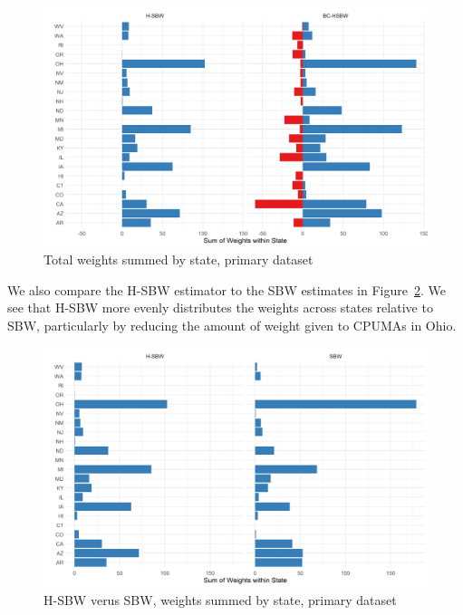 \documentclass[aoas]{imsart}
\theoremstyle{plain}
\theoremstyle{remark}
\begin{document}
\begin{figure}[H]
\begin{center}
    \caption{Total weights summed by state, primary dataset}
    \label{fig:statewghts}
    \includegraphics[scale=0.6]{01_Plots/weights-by-state-hsbw-c1.png}
\end{center}
\end{figure}

We also compare the H-SBW estimator to the SBW estimates in Figure~\ref{fig:sbwvhsbw1}. We see that H-SBW more evenly distributes the weights across states relative to SBW, particularly by reducing the amount of weight given to CPUMAs in Ohio. 

\begin{figure}[H]
\begin{center}
    \caption{H-SBW verus SBW, weights summed by state, primary dataset}
    \label{fig:sbwvhsbw1}
    \includegraphics[scale=0.6]{01_Plots/weights-by-state-sbw-hsbw-c1.png}
\end{center}
\end{figure}
\end{document}
